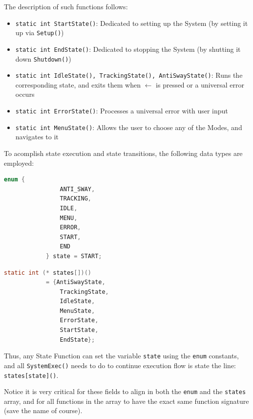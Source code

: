 \documentclass[letterpaper]{article}
\begin{document}
The description of such functions follows:
\begin{itemize}
    \item \texttt{static int StartState()}: Dedicated to setting up the System (by setting it up via \texttt{Setup()})
    \item \texttt{static int EndState()}: Dedicated to stopping the System (by shutting it down \texttt{Shutdown()})
    \item \texttt{static int IdleState(), TrackingState(), AntiSwayState()}: Runs the corresponding state, and exits them when $\leftarrow$ is pressed or a universal error occurs
    \item \texttt{static int ErrorState()}: Processes a universal error with user input
    \item \texttt{static int MenuState()}: Allows the user to choose any of the Modes, and navigates to it
\end{itemize}
To acomplish state execution and state transitions, the following data types are employed:
\begin{multicols}{2}
    \begin{center}
        \begin{lstlisting}[language=C]
            enum {
                ANTI_SWAY,
                TRACKING,
                IDLE,
                MENU,
                ERROR,
                START,
                END
            } state = START;
                \end{lstlisting}
    \end{center}
    
    \columnbreak
    \begin{center}
        \begin{lstlisting}[language=C]
        static int (* states[])()
            = {AntiSwayState,
                TrackingState,
                IdleState,
                MenuState,
                ErrorState,
                StartState,
                EndState};
            \end{lstlisting}
    \end{center}
\end{multicols}
Thus, any State Function can set the variable \texttt{state} using the \texttt{enum} constants, and all \texttt{SystemExec()} needs to do to continue execution flow is state the line: \texttt{states[state]()}.

\begin{tcolorbox}[colframe=blue!50!black!70,title=Future Modification]
    Notice it is very critical for these fields to align in both the \texttt{enum} and the \texttt{states} array, and for all functions in the array to have the exact same function signature (save the name of course).
\end{tcolorbox}
\end{document}
